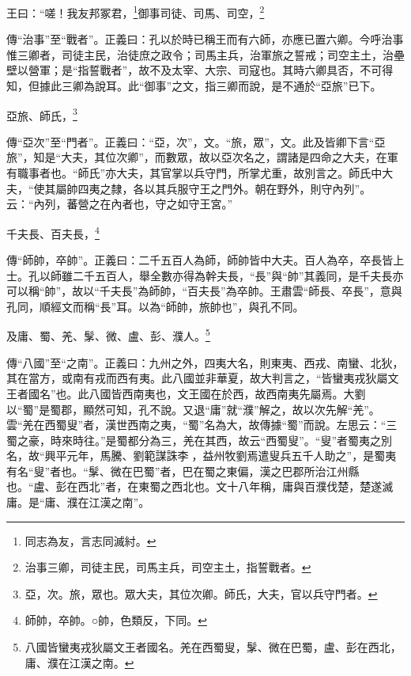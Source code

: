 王曰：“嗟！我友邦冢君，\footnote{同志為友，言志同滅紂。}御事司徒、司馬、司空，\footnote{治事三卿，司徒主民，司馬主兵，司空主土，指誓戰者。}

{\noindent\zhuan{}\fzbyks 傳“治事”至“戰者”。正義曰：孔以於時已稱王而有六師，亦應已置六卿。今呼治事惟三卿者，司徒主民，治徒庶之政令；司馬主兵，治軍旅之誓戒；司空主土，治壘壁以營軍；是“指誓戰者”，故不及太宰、大宗、司寇也。其時六卿具否，不可得知，但據此三卿為說耳。此“御事”之文，指三卿而說，是不通於“亞旅”已下。 \par}

亞旅、師氏，\footnote{亞，次。旅，眾也。眾大夫，其位次卿。師氏，大夫，官以兵守門者。}

{\noindent\zhuan{}\fzbyks 傳“亞次”至“門者”。正義曰：“亞，次”，文。“旅，眾”，文。此及皆卿下言“亞旅”，知是“大夫，其位次卿”，而數眾，故以亞次名之，謂諸是四命之大夫，在軍有職事者也。“師氏”亦大夫，其官掌以兵守門，所掌尤重，故別言之。師氏中大夫，“使其屬帥四夷之隸，各以其兵服守王之門外。朝在野外，則守內列”。云：“內列，蕃營之在內者也，守之如守王宮。” \par}

千夫長、百夫長，\footnote{師帥，卒帥。○帥，色類反，下同。}

{\noindent\zhuan{}\fzbyks 傳“師帥，卒帥”。正義曰：二千五百人為師，師帥皆中大夫。百人為卒，卒長皆上士。孔以師雖二千五百人，舉全數亦得為幹夫長，“長”與“帥”其義同，是千夫長亦可以稱“帥”，故以“千夫長”為師帥，“百夫長”為卒帥。王肅雲“師長、卒長”，意與孔同，順經文而稱“長”耳。以為“師帥，旅帥也”，與孔不同。 \par}

及庸、蜀、羌、髳、微、盧、彭、濮人。\footnote{八國皆蠻夷戎狄屬文王者國名。羌在西蜀叟，髳、微在巴蜀，盧、彭在西北，庸、濮在江漢之南。}

{\noindent\zhuan{}\fzbyks 傳“八國”至“之南”。正義曰：九州之外，四夷大名，則東夷、西戎、南蠻、北狄，其在當方，或南有戎而西有夷。此八國並非華夏，故大判言之，“皆蠻夷戎狄屬文王者國名”也。此八國皆西南夷也，文王國在於西，故西南夷先屬焉。大劉以“蜀”是蜀郡，顯然可知，孔不說。又退“庸”就“濮”解之，故以次先解“羌”。雲“羌在西蜀叟”者，漢世西南之夷，“蜀”名為大，故傳據“蜀”而說。左思云：“三蜀之豪，時來時往。”是蜀都分為三，羌在其西，故云“西蜀叟”。“叟”者蜀夷之別名，故“興平元年，馬騰、劉範謀誅李𠐶，益州牧劉焉遣叟兵五千人助之”，是蜀夷有名“叟”者也。“髳、微在巴蜀”者，巴在蜀之東偏，漢之巴郡所治江州縣也。“盧、彭在西北”者，在東蜀之西北也。文十八年稱，庸與百濮伐楚，楚遂滅庸。是“庸、濮在江漢之南”。 \par}

